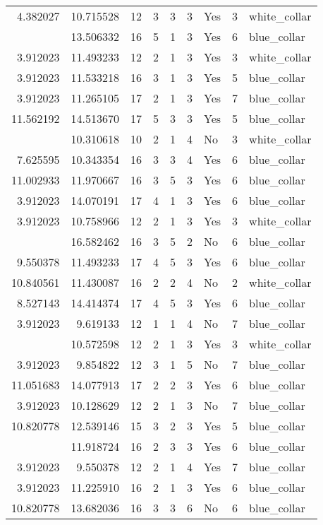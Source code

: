 \documentclass[
]{article}
\begin{document}
\begin{longtable}[t]{rrrrrllrl}
4.382027 & 10.715528 & 12 & 3 & 3 & 3 & Yes & 3 & white\_collar\\
\addlinespace
3.912023 & 13.506332 & 16 & 5 & 1 & 3 & Yes & 6 & blue\_collar\\
3.912023 & 11.493233 & 12 & 2 & 1 & 3 & Yes & 3 & white\_collar\\
3.912023 & 11.533218 & 16 & 3 & 1 & 3 & Yes & 5 & blue\_collar\\
3.912023 & 11.265105 & 17 & 2 & 1 & 3 & Yes & 7 & blue\_collar\\
11.562192 & 14.513670 & 17 & 5 & 3 & 3 & Yes & 5 & blue\_collar\\
\addlinespace
3.912023 & 10.310618 & 10 & 2 & 1 & 4 & No & 3 & white\_collar\\
7.625595 & 10.343354 & 16 & 3 & 3 & 4 & Yes & 6 & blue\_collar\\
11.002933 & 11.970667 & 16 & 3 & 5 & 3 & Yes & 6 & blue\_collar\\
3.912023 & 14.070191 & 17 & 4 & 1 & 3 & Yes & 6 & blue\_collar\\
3.912023 & 10.758966 & 12 & 2 & 1 & 3 & Yes & 3 & white\_collar\\
\addlinespace
16.060472 & 16.582462 & 16 & 3 & 5 & 2 & No & 6 & blue\_collar\\
9.550378 & 11.493233 & 17 & 4 & 5 & 3 & Yes & 6 & blue\_collar\\
10.840561 & 11.430087 & 16 & 2 & 2 & 4 & No & 2 & white\_collar\\
8.527143 & 14.414374 & 17 & 4 & 5 & 3 & Yes & 6 & blue\_collar\\
3.912023 & 9.619133 & 12 & 1 & 1 & 4 & No & 7 & blue\_collar\\
\addlinespace
3.912023 & 10.572598 & 12 & 2 & 1 & 3 & Yes & 3 & white\_collar\\
3.912023 & 9.854822 & 12 & 3 & 1 & 5 & No & 7 & blue\_collar\\
11.051683 & 14.077913 & 17 & 2 & 2 & 3 & Yes & 6 & blue\_collar\\
3.912023 & 10.128629 & 12 & 2 & 1 & 3 & No & 7 & blue\_collar\\
10.820778 & 12.539146 & 15 & 3 & 2 & 3 & Yes & 5 & blue\_collar\\
\addlinespace
8.022897 & 11.918724 & 16 & 2 & 3 & 3 & Yes & 6 & blue\_collar\\
3.912023 & 9.550378 & 12 & 2 & 1 & 4 & Yes & 7 & blue\_collar\\
3.912023 & 11.225910 & 16 & 2 & 1 & 3 & Yes & 6 & blue\_collar\\
10.820778 & 13.682036 & 16 & 3 & 3 & 6 & No & 6 & blue\_collar\\

\end{longtable}
\end{document}
